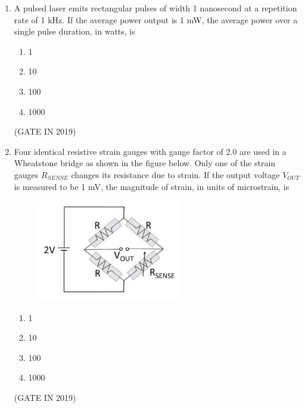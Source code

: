 \documentclass[journal]{IEEEtran}
\begin{document}
\begin{enumerate}
\item A pulsed laser emits rectangular pulses of width 1 nanosecond at a repetition rate of 1 kHz. If the average power output is 1 mW, the average power over a single pulse duration, in watts, is
\begin{multicols}{4}
\begin{enumerate}
\item 1
\item 10
\item 100
\item 1000
\end{enumerate}
\end{multicols} \hfill(GATE IN 2019)

\item Four identical resistive strain gauges with gauge factor of 2.0 are used in a Wheatstone bridge as shown in the figure below. Only one of the strain gauges $R_{SENSE}$ changes its resistance due to strain. If the output voltage $V_{OUT}$ is measured to be 1 mV, the magnitude of strain, in units of microstrain, is
\begin{figure}[H]
    \centering
    \includegraphics[width=0.6\textwidth]{16.png}
    \caption{}
    \label{fig:fig16}
\end{figure}
\begin{enumerate}
\item 1
\item 10
\item 100
\item 1000
\end{enumerate}
\hfill(GATE IN 2019)


\end{enumerate}
\end{document}
